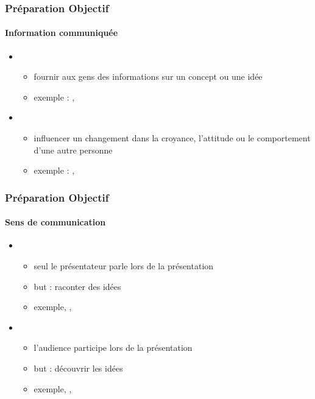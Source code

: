\documentclass[xcolor=table, usenames,dvipsnames]{beamer}
\begin{document}
\begin{frame}
\frametitle{Préparation Objectif}
\framesubtitle{Information communiquée}

\begin{itemize}
	\item {}
	\begin{itemize}
		\item fournir aux gens des informations sur un concept ou une idée 
		\item exemple : , 
	\end{itemize}

	\item {}
	\begin{itemize}
		\item influencer un changement dans la croyance, l'attitude ou le comportement d'une autre personne 
		\item exemple : , 
	\end{itemize}
\end{itemize}

\end{frame}

\begin{frame}
\frametitle{Préparation Objectif}
\framesubtitle{Sens de communication}

\begin{itemize}
	\item {}
	\begin{itemize}
		\item seul le présentateur parle lors de la présentation 
		\item but : raconter des idées
		\item exemple, , 
	\end{itemize}

	\item {}
	\begin{itemize}
		\item l'audience participe lors de la présentation
		\item but : découvrir les idées
		\item exemple, , 
	\end{itemize}
\end{itemize}

\end{frame}
\end{document}
